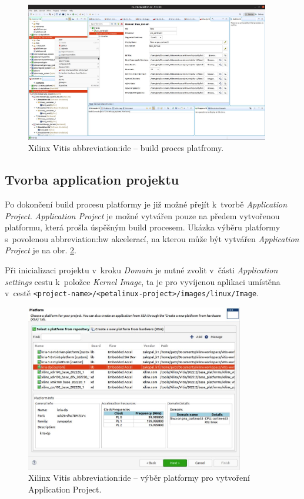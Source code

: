 \documentclass[a4paper, twoside, 11pt]{article}
\newcommand{\fbar}{\FloatBarrier}
\begin{document}
		\begin{figure}[htbp!]
			\centering
			\includegraphics[width=0.95\textwidth]{src/jpg/vitis-build-project-platform.jpg}
			\caption{Xilinx Vitis \gls{abbreviation:ide} – build proces platfromy.}
			\label{fig:vitis-platform-build}
		\end{figure}

		\fbar
		\subsection{Tvorba application projektu}
		Po dokončení build procesu platformy je již možné přejít k~tvorbě \textit{Application Project}. \textit{Application Project} je možné vytvářen pouze na předem vytvořenou platformu, která prošla úspěšným build procesem. Ukázka výběru platformy s~povolenou \gls{abbreviation:hw} akcelerací, na kterou může být vytvářen \textit{Application Project} je na obr. \ref{fig:vitis-application-project-platform-selection}.\par
		Při inicializaci projektu v~kroku \textit{Domain} je nutné zvolit v~části \textit{Application settings} cestu k~položce \textit{Kernel Image}, ta je pro vyvíjenou aplikaci umístěna v~cestě \texttt{<project-name>/<petalinux-project>/images/linux/Image}.

		\begin{figure}[htbp!]
			\centering
			\includegraphics[width=0.85\textwidth]{src/jpg/vitis-application-project-platform-selection.jpg}
			\caption{Xilinx Vitis \gls{abbreviation:ide} – výběr platformy pro vytvoření Application Project.}
			\label{fig:vitis-application-project-platform-selection}
		\end{figure}
\end{document}
